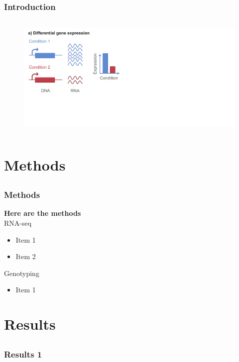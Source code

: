 \documentclass[pdf, usepdftitle=false]{beamer}
\begin{document}
\begin{frame}
\frametitle{Introduction} 
\begin{columns}
\begin{column}{1.1\textwidth}
\begin{figure}[H]
\includegraphics[width=\textwidth]{Diffex.pdf}
\end{figure}
\end{column}
\end{columns}
\end{frame}


\section{Methods}
\subsection{}
\begin{frame}
\frametitle{Methods}

\textbf{Here are the methods}\\
\vspace{0.5cm}
RNA-seq
\begin{itemize}
\item Item 1
\item Item 2
\end{itemize}

\vspace{0.5cm}
Genotyping
\begin{itemize}
\item Item 1
\end{itemize}
\end{frame}

\section{Results}
\subsection{}
\begin{frame}
\frametitle{Results 1}

\end{frame}
\end{document}
